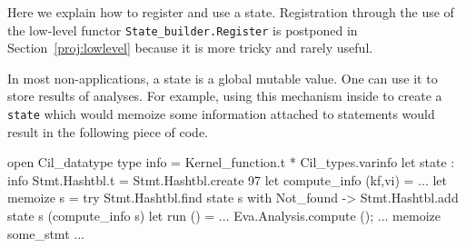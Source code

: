 Here we explain how to register and use a state. Registration through the use of
the low-level functor \texttt{State\_builder.Register} is postponed in
Section~\ref{proj:lowlevel} because it is more tricky and rarely useful.

In most non-\framac applications, a state is a global mutable value. One can use
it to store results of analyses. For example, using this mechanism inside
\framac to create a \texttt{state} which would memoize some
information attached to statements would result in the following piece of code.
\begin{ocamlcode}
open Cil_datatype
type info = Kernel_function.t * Cil_types.varinfo
let state : info Stmt.Hashtbl.t = Stmt.Hashtbl.create 97
let compute_info (kf,vi) = ...
let memoize s =
  try Stmt.Hashtbl.find state s
  with Not_found -> Stmt.Hashtbl.add state s (compute_info s)
let run () = ... Eva.Analysis.compute (); ... memoize some_stmt ...
\end{ocamlcode}

